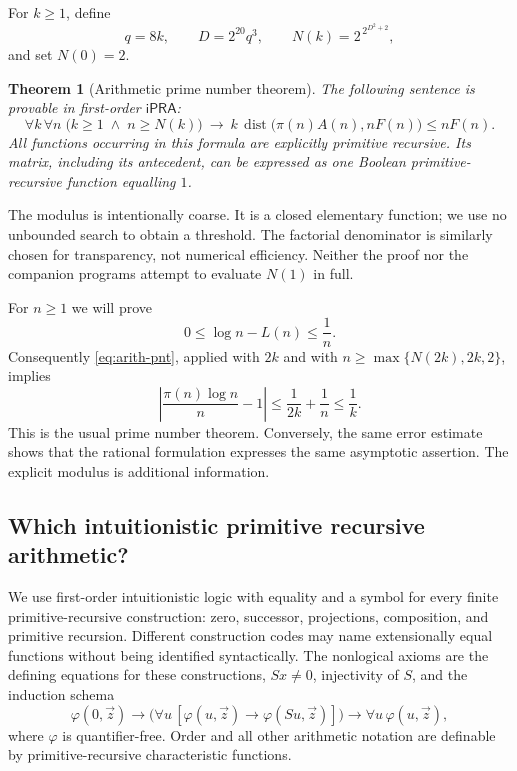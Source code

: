 \documentclass[11pt]{article}
\newtheorem{theorem}{Theorem}[section]
\theoremstyle{definition}
\theoremstyle{remark}
\newcommand{\ipra}{\mathsf{iPRA}}
\newcommand{\abs}[1]{\left|#1\right|}
\newcommand{\dist}{\operatorname{dist}}
\begin{document}
For $k\ge1$, define
\begin{equation}\label{eq:modulus}
 q=8k,\qquad D=2^{20}q^3,\qquad
 N(k)=2^{\,2^{D^2+2}},
\end{equation}
and set $N(0)=2$.

\begin{theorem}[Arithmetic prime number theorem]\label{thm:main}
The following sentence is provable in first-order $\ipra$:
\begin{equation}\label{eq:arith-pnt}
 \forall k\,\forall n\;
 \bigl(k\ge1\;\wedge\; n\ge N(k)\bigr)
 \ \longrightarrow\ 
 k\,\dist\bigl(\pi(n)A(n),nF(n)\bigr)\le nF(n).
\end{equation}
All functions occurring in this formula are explicitly primitive recursive.
Its matrix, including its antecedent, can be expressed as one Boolean
primitive-recursive function equalling $1$.
\end{theorem}

The modulus is intentionally coarse. It is a closed elementary function;
we use no unbounded search to obtain a threshold. The factorial denominator
is similarly chosen for transparency, not numerical efficiency. Neither
the proof nor the companion programs attempt to evaluate $N(1)$ in full.

For $n\ge1$ we will prove
\begin{equation}\label{eq:log-surrogate}
 0\le \log n-L(n)\le\frac1n.
\end{equation}
Consequently \eqref{eq:arith-pnt}, applied with $2k$ and with
$n\ge\max\{N(2k),2k,2\}$, implies
\[
 \abs{\frac{\pi(n)\log n}{n}-1}
 \le\frac1{2k}+\frac1n\le\frac1k.
\]
This is the usual prime number theorem. Conversely, the same error estimate
shows that the rational formulation expresses the same asymptotic assertion.
The explicit modulus is additional information.

\subsection{Which intuitionistic primitive recursive arithmetic?}

We use first-order intuitionistic logic with equality and a symbol for every
finite primitive-recursive construction: zero, successor, projections,
composition, and primitive recursion. Different construction codes may name
extensionally equal functions without being identified syntactically.
The nonlogical axioms are the defining equations for these constructions,
$Sx\ne0$, injectivity of $S$, and the induction schema
\begin{equation}\label{eq:qfind}
 \varphi(0,\vec z)\to
 \bigl(\forall u\,[\varphi(u,\vec z)\to\varphi(Su,\vec z)]\bigr)
 \to\forall u\,\varphi(u,\vec z),
\end{equation}
where $\varphi$ is quantifier-free. Order and all other arithmetic notation
are definable by primitive-recursive characteristic functions.
\end{document}
